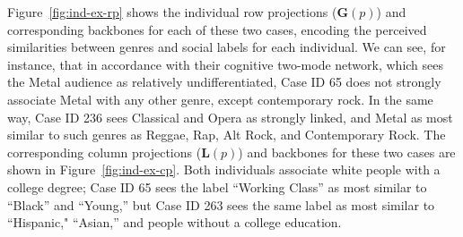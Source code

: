 \documentclass[12pt]{article}
\begin{document}
Figure~\ref{fig:ind-ex-rp} shows the individual row projections ($\mathbf{G}(p)$) and corresponding backbones for each of these two cases, encoding the perceived similarities between genres and social labels for each individual. We can see, for instance, that in accordance with their cognitive two-mode network, which sees the Metal audience as relatively undifferentiated, Case ID 65 does not strongly associate Metal with any other genre, except contemporary rock. In the same way, Case ID 236 sees Classical and Opera as strongly linked, and Metal as most similar to such genres as Reggae, Rap, Alt Rock, and Contemporary Rock. The corresponding column projections ($\mathbf{L}(p)$) and backbones for these two cases are shown in Figure~\ref{fig:ind-ex-cp}. Both individuals associate white people with a college degree; Case ID 65 sees the label ``Working Class'' as most similar to ``Black'' and ``Young,'' but Case ID 263 sees the same label as most similar to ``Hispanic," ``Asian,'' and people without a college education. 
\end{document}
